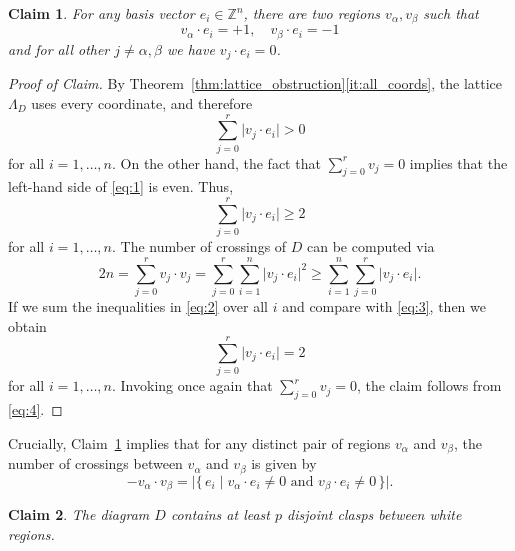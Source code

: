 \documentclass[a4paper,11pt]{amsart}
\newtheorem{claim}{Claim}
\theoremstyle{definition}
\theoremstyle{remark}
\numberwithin{equation}{section}
\newcommand{\Z}{\mathbb{Z}}
\begin{document}
\begin{claim}\label{claim1}
    For any basis vector $e_i\in \Z^n$, there are two regions $v_\alpha, v_\beta$ such that 
    \[v_\alpha \cdot e_i = +1,\quad v_\beta \cdot e_i=-1\] and for all other $j\neq \alpha,\beta$ we have $v_j\cdot e_i=0$.
\end{claim}
\begin{proof}[Proof of Claim]
By Theorem~\ref{thm:lattice_obstruction}\eqref{it:all_coords}, the lattice $\Lambda_D$ uses every coordinate, and therefore
\begin{equation}\label{eq:1}
\sum_{j=0}^r \bigl|v_j\cdot e_i\bigr|>0
\end{equation}
for all $i=1,\dots,n$. On the other hand, the fact that $\sum_{j=0}^r v_j=0$ implies that the left-hand side of \eqref{eq:1} is even. Thus,
\begin{equation}\label{eq:2}
\sum_{j=0}^r \bigl|v_j\cdot e_i\bigr|\ge 2
\end{equation}
for all $i=1,\dots,n$. The number of crossings of $D$ can be computed via
\begin{equation}\label{eq:3}
2n=\sum_{j=0}^r v_j\cdot v_j
=\sum_{j=0}^r\sum_{i=1}^n \bigl|v_j\cdot e_i\bigr|^2
\ge \sum_{i=1}^n\sum_{j=0}^r \bigl|v_j\cdot e_i\bigr|.
\end{equation}
If we sum the inequalities in \eqref{eq:2} over all $i$ and compare with \eqref{eq:3}, then we obtain
\begin{equation}\label{eq:4}
\sum_{j=0}^r \bigl|v_j\cdot e_i\bigr|=2
\end{equation}
for all $i=1,\dots,n$. Invoking once again that $\sum_{j=0}^r v_j=0$, the claim follows from \eqref{eq:4}.
\end{proof}
Crucially, Claim~\ref{claim1} implies that for any distinct pair of regions $v_\alpha$ and $v_\beta$, the number of crossings between $v_\alpha$ and $v_\beta$ is given by
\[
-v_\alpha \cdot v_\beta
=
\bigl|\{\,e_i \mid v_\alpha \cdot e_i \neq 0 \text{ and } v_\beta \cdot e_i \neq 0\,\}\bigr|.
\]\vspace{-1.2\baselineskip}
\begin{claim}\label{claim2}
The diagram $D$ contains at least $p$ disjoint clasps between white regions.
\end{claim}
\end{document}
